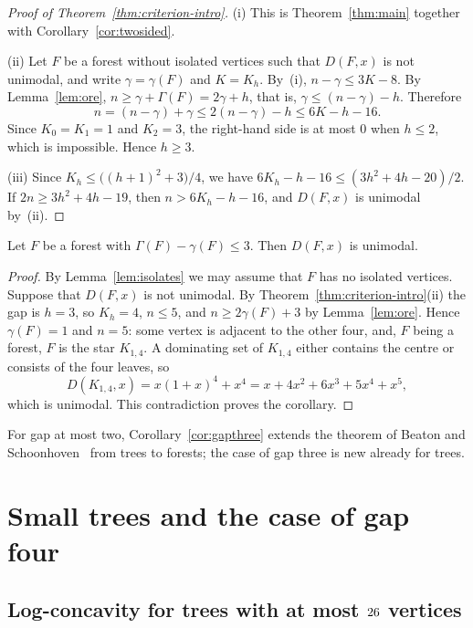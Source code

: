 \begin{proof}[Proof of Theorem~\ref{thm:criterion-intro}]
(i) This is Theorem~\ref{thm:main} together with
Corollary~\ref{cor:twosided}.

(ii) Let $F$ be a forest without isolated vertices such that $D(F,x)$ is not
unimodal, and write $\gamma=\gamma(F)$ and $K=K_h$. By~(i),
$n-\gamma\le 3K-8$. By Lemma~\ref{lem:ore}, $n\ge\gamma+\Gamma(F)=2\gamma+h$,
that is, $\gamma\le(n-\gamma)-h$. Therefore
\[
  n=(n-\gamma)+\gamma\le 2(n-\gamma)-h\le 6K-h-16 .
\]
Since $K_0=K_1=1$ and $K_2=3$, the right-hand side is at most $0$ when
$h\le2$, which is impossible. Hence $h\ge3$.

(iii) Since $K_h\le\bigl((h+1)^2+3\bigr)/4$, we have
$6K_h-h-16\le(3h^2+4h-20)/2$. If $2n\ge3h^2+4h-19$, then $n>6K_h-h-16$, and
$D(F,x)$ is unimodal by~(ii).
\end{proof}

\begin{corollary}\label{cor:gapthree}
Let $F$ be a forest with $\Gamma(F)-\gamma(F)\le3$. Then $D(F,x)$ is
unimodal.
\end{corollary}

\begin{proof}
By Lemma~\ref{lem:isolates} we may assume that $F$ has no isolated vertices.
Suppose that $D(F,x)$ is not unimodal. By
Theorem~\ref{thm:criterion-intro}(ii) the gap is $h=3$, so $K_h=4$,
$n\le5$, and $n\ge2\gamma(F)+3$ by Lemma~\ref{lem:ore}. Hence $\gamma(F)=1$
and $n=5$: some vertex is adjacent to the other four, and, $F$ being a
forest, $F$ is the star $K_{1,4}$. A dominating set of $K_{1,4}$ either
contains the centre or consists of the four leaves, so
\[
  D(K_{1,4},x)=x(1+x)^4+x^4=x+4x^2+6x^3+5x^4+x^5 ,
\]
which is unimodal. This contradiction proves the corollary.
\end{proof}

For gap at most two, Corollary~\ref{cor:gapthree} extends the theorem of
Beaton and Schoonhoven~\cite[Corollary~17]{BS} from trees to forests; the case
of gap three is new already for trees.

\section{Small trees and the case of gap four}\label{sec:small}

\subsection{Log-concavity for trees with at most \texorpdfstring{$26$}{26} vertices}

